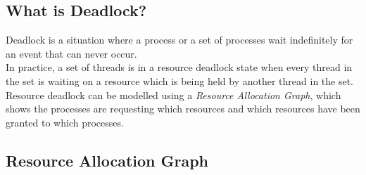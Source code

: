 \subsection{What is Deadlock?}
Deadlock is a situation where a process or a set of processes wait indefinitely for an event that can never occur.\\

In practice, a set of threads is in a resource deadlock state when every thread in the set is waiting on a resource which is being held by another thread in the set.\\

Resource deadlock can be modelled using a \textit{Resource Allocation Graph}, which shows the processes are requesting which resources and which resources have been granted to which processes.

\subsection{Resource Allocation Graph}
